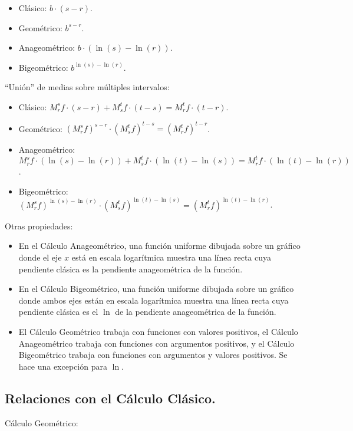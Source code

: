 \begin{itemize}
	\item Clásico: $b \cdot (s - r)$.
	\item Geométrico: $b^{s-r}$.
	\item Anageométrico: $b \cdot (\ln(s) - \ln(r))$.
	\item Bigeométrico: $b^{\ln(s) - \ln(r)}$.
\end{itemize}

\enquote{Unión} de medias sobre múltiples intervalos:

\begin{itemize}
	\item Clásico: $M_r^s f \cdot (s - r) + M_s^t f \cdot (t - s) = M_r^t f \cdot (t - r)$.
	\item Geométrico: $(M_r^s f)^{s - r} \cdot (M_s^t f)^{t - s} = (M_r^t f)^{t - r}$.
	\item Anageométrico: $M_r^s f \cdot (\ln(s) - \ln(r)) + M_s^t f \cdot (\ln(t) - \ln(s)) = M_r^t f \cdot (\ln(t) - \ln(r))$.
	\item Bigeométrico: $(M_r^s f)^{\ln(s) - \ln(r)} \cdot (M_s^t f)^{\ln(t) - \ln(s)} = (M_r^t f)^{\ln(t) - \ln(r)}$.
\end{itemize}

Otras propiedades:

\begin{itemize}
	\item En el Cálculo Anageométrico, una función uniforme dibujada sobre un gráfico donde el eje $x$ está en escala logarítmica muestra una línea recta cuya pendiente clásica es la pendiente anageométrica de la función.
	\item En el Cálculo Bigeométrico, una función uniforme dibujada sobre un gráfico donde ambos ejes están en escala logarítmica muestra una línea recta cuya pendiente clásica es el $\ln$ de la pendiente anageométrica de la función.
	\item El Cálculo Geométrico trabaja con funciones con valores positivos, el Cálculo Anageométrico trabaja con funciones con argumentos positivos, y el Cálculo Bigeométrico trabaja con funciones con argumentos y valores positivos. Se hace una excepción para $\ln$.
\end{itemize}

\subsection{Relaciones con el Cálculo Clásico.}

Cálculo Geométrico:

